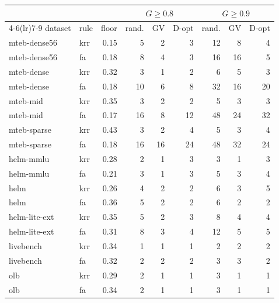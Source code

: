 \begin{tabular}{llrrrrrrr}
\toprule
 & & & \multicolumn{3}{c}{$G\geq0.8$} & \multicolumn{3}{c}{$G\geq0.9$} \\
\cmidrule(lr){4-6}\cmidrule(lr){7-9}
dataset & rule & floor & rand. & GV & D-opt & rand. & GV & D-opt \\
\midrule
mteb-dense56 & krr & 0.15 & 5 & 2 & 3 & 12 & 8 & 4 \\
mteb-dense56 & fa & 0.18 & 8 & 4 & 3 & 16 & 16 & 5 \\
mteb-dense & krr & 0.32 & 3 & 1 & 2 & 6 & 5 & 3 \\
mteb-dense & fa & 0.18 & 10 & 6 & 8 & 32 & 16 & 20 \\
mteb-mid & krr & 0.35 & 3 & 2 & 2 & 5 & 3 & 3 \\
mteb-mid & fa & 0.17 & 16 & 8 & 12 & 48 & 24 & 32 \\
mteb-sparse & krr & 0.43 & 3 & 2 & 4 & 5 & 3 & 4 \\
mteb-sparse & fa & 0.18 & 16 & 16 & 24 & 48 & 32 & 24 \\
helm-mmlu & krr & 0.28 & 2 & 1 & 3 & 3 & 1 & 3 \\
helm-mmlu & fa & 0.21 & 3 & 1 & 3 & 5 & 3 & 4 \\
helm & krr & 0.26 & 4 & 2 & 2 & 6 & 3 & 5 \\
helm & fa & 0.36 & 5 & 2 & 2 & 6 & 2 & 2 \\
helm-lite-ext & krr & 0.35 & 5 & 2 & 3 & 8 & 4 & 4 \\
helm-lite-ext & fa & 0.31 & 8 & 3 & 4 & 12 & 5 & 5 \\
livebench & krr & 0.34 & 1 & 1 & 1 & 2 & 2 & 2 \\
livebench & fa & 0.32 & 2 & 2 & 2 & 3 & 3 & 2 \\
olb & krr & 0.29 & 2 & 1 & 1 & 3 & 1 & 1 \\
olb & fa & 0.34 & 2 & 1 & 1 & 3 & 1 & 1 \\
\bottomrule
\end{tabular}
